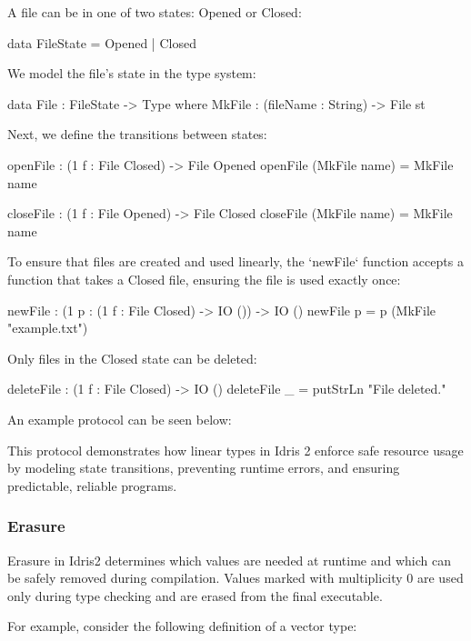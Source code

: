 \documentclass[]{rptuseminar}
\begin{document}
A file can be in one of two states: Opened or Closed:
\begin{idris} 
data FileState = Opened | Closed
\end{idris}

We model the file's state in the type system:
\begin{idris}
data File : FileState -> Type where
    MkFile : (fileName : String) -> File st
\end{idris}

Next, we define the transitions between states:
\begin{idris}
openFile : (1 f : File Closed) -> File Opened
openFile (MkFile name) = MkFile name

closeFile : (1 f : File Opened) -> File Closed
closeFile (MkFile name) = MkFile name
\end{idris}

To ensure that files are created and used linearly, the `newFile` function accepts a function that takes a Closed file, ensuring the file is used exactly once:
\begin{idris}
newFile : (1 p : (1 f : File Closed) -> IO ()) -> IO ()
newFile p = p (MkFile "example.txt")
\end{idris}

Only files in the Closed state can be deleted:
\begin{idris}
deleteFile : (1 f : File Closed) -> IO ()
deleteFile _ = putStrLn "File deleted."
\end{idris}

An example protocol can be seen below:

This protocol demonstrates how linear types in Idris 2 enforce safe resource usage by modeling state transitions, preventing runtime errors, and ensuring predictable, reliable programs.

\subsubsection{Erasure}
Erasure in Idris2 determines which values are needed at runtime and which can be safely removed during compilation. Values marked with multiplicity 0 are used only during type checking and are erased from the final executable.

For example, consider the following definition of a vector type:
\end{document}
